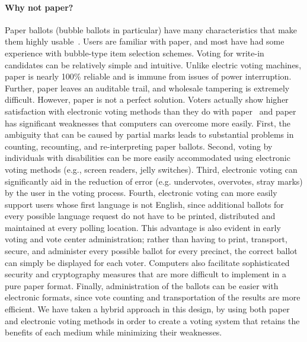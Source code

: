 \paragraph{Why not paper?}
Paper ballots (bubble ballots in particular) have many characteristics
that make them highly usable~\cite{hfes-06,byrne-baseline}. Users are
familiar with paper, and most have had some experience with bubble-type
item selection schemes. Voting for write-in candidates can be relatively
simple and intuitive. Unlike electric voting machines, paper is nearly
100\% reliable and is immune from issues of power interruption. Further,
paper leaves an auditable trail, and wholesale tampering is extremely
difficult. However, paper is not a perfect solution. Voters actually
show higher satisfaction with electronic voting methods than they do
with paper~\cite{everett08chi-dre-usability} and paper has significant
weaknesses that computers can overcome more easily. First, the ambiguity
that can be caused by partial marks leads to substantial problems in
counting, recounting, and re-interpreting paper ballots. Second, voting
by individuals with disabilities can be more easily accommodated using
electronic voting methods (e.g., screen readers, jelly switches). Third,
electronic voting can significantly aid in the reduction of error (e.g.
undervotes, overvotes, stray marks) by the user in the voting process.
Fourth, electronic voting can more easily support users whose first
language is not English, since additional ballots for every possible
language request do not have to be printed, distributed and maintained
at every polling location. This advantage is also evident in early
voting and vote center administration; rather than having to print,
transport, secure, and administer every possible ballot for every
precinct, the correct ballot can simply be displayed for each voter.
Computers also facilitate sophisticated security and cryptography
measures that are more difficult to implement in a pure paper format.
Finally, administration of the ballots can be easier with electronic
formats, since vote counting and transportation of the results are more
efficient. We have taken a hybrid approach in this design, by using both
paper and electronic voting methods in order to create a voting system
that retains the benefits of each medium while minimizing their
weaknesses. 

